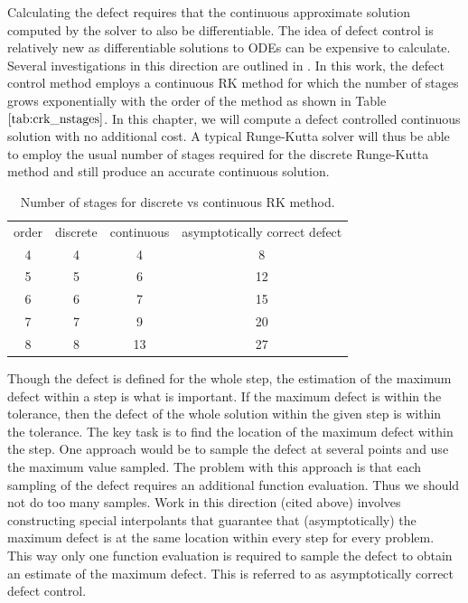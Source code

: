 Calculating the defect requires that the continuous approximate solution computed by the solver to also be differentiable. The idea of defect control is relatively new as differentiable solutions to ODEs can be expensive to calculate. Several investigations in this direction are outlined in \cites{MR2600928}{MR1950917}{MR1803189}{MR1239829}{MR997658}{MR996053}. In this work, the defect control method employs a continuous RK method for which the number of stages grows exponentially with the order of the method as shown in Table $\ref{tab:crk_nstages}$. In this chapter, we will compute a defect controlled continuous solution with no additional cost. A typical Runge-Kutta solver will thus be able to employ the usual number of stages required for the discrete Runge-Kutta method and still produce an accurate continuous solution.

\begin{table}[h]
\caption {Number of stages for discrete vs continuous RK method.} 
\label{tab:crk_nstages}
\begin{center}
\begin{tabular}{ c c c c} 
order   & discrete & continuous & asymptotically correct defect \\ 
4 & 4  & 4   & 8 \\ 
5 & 5  & 6   & 12 \\ 
6 & 6  & 7   & 15 \\ 
7 & 7  & 9   & 20 \\ 
8 & 8  & 13  & 27 \\ 
\end{tabular}
\end{center}
\end{table}

Though the defect is defined for the whole step, the estimation of the maximum defect within a step is what is important. If the maximum defect is within the tolerance, then the defect of the whole solution within the given step is within the tolerance. The key task is to find the location of the maximum defect within the step. One approach would be to sample the defect at several points and use the maximum value sampled. The problem with this approach is that each sampling of the defect requires an additional function evaluation. Thus we should not do too many samples. Work in this direction (cited above) involves constructing special interpolants that guarantee that (asymptotically) the maximum defect is at the same location within every step for every problem. This way only one function evaluation is required to sample the defect to obtain an estimate of the maximum defect. This is referred to as asymptotically correct defect control.

